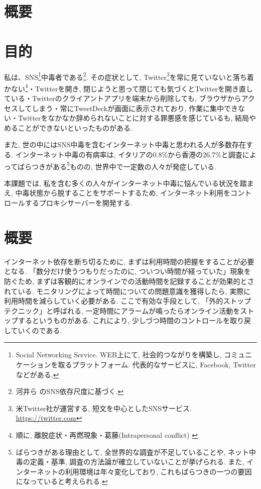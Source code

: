 \documentclass[10pt,a4paper,uplatex,a4j,dvipdfmx]{jsarticle}
\begin{document}
    \section*{概要}


    \newpage

    \begin{multicols}{2}

    \section{目的}
    私は、SNS\footnote{Social Networking Service. WEB上にて, 社会的つながりを構築し, コミュニケーションを取るプラットフォーム. 代表的なサービスに, Facebook, Twitterなどがある.}中毒者である\footnote{河井ら \cite{kawai2011sns} のSNS依存尺度に基づく.}.
    その症状として, Twitter\footnote{米Twitter社が運営する, 短文を中心としたSNSサービス. \url{https://twitter.com}}を常に見ていないと落ち着かない\footnote{順に, 離脱症状・再燃現象・葛藤(Intrapersonal conflict) \cite{griffiths2005} \label{tw}}・Twitterを開き, 閉じようと思って閉じても気づくとTwitterを開き直している・Twitterのクライアントアプリを端末から削除しても, ブラウザからアクセスしてしまう・常にTweetDeckが画面に表示されており, 作業に集中できない・Twitterをなかなか辞められないことに対する罪悪感を感じているも, 結局やめることができないといったものがある.
    
    また, 世の中にはSNS中毒を含むインターネット中毒と思われる人が多数存在する.
    インターネット中毒の有病率は, イタリアの0.8\%から香港の26.7\%と調査によってばらつきがある\footnote{ばらつきがある理由として, 全世界的な調査が不足していることや, ネット中毒の定義・基準, 調査の方法論が確立していないことが挙げられる\cite{IAreview}. また, インターネットの利用環境は年々変化しており, これもばらつきの一つの要因になっていると考えられる.}ものの, 世界中で一定数の人々が発症している\cite{IAreview}.
    
  本課題では, 私を含む多くの人々がインターネット中毒に悩んでいる状況を踏まえ, 中毒状態から脱することをサポートするため, インターネット利用をコントロールするプロキシサーバーを開発する.



    \section{概要}
    インターネット依存を断ち切るために, まずは利用時間の把握をすることが必要となる. 「数分だけ使うつもりだったのに, ついつい時間が経っていた」現象を防ぐため, まずは客観的にオンラインでの活動時間を記録することが効果的とされている\cite{internetaddiction}.
    モニタリングによって時間についての問題意識を獲得したら, 実際に利用時間を減らしていく必要がある. ここで有効な手段として, 「外的ストップテクニック」と呼ばれる, 一定時間にアラームが鳴ったらオンライン活動をストップするというものがある\cite{internetaddiction}. これにより, 少しづつ時間のコントロールを取り戻していくのである.


\end{multicols}
\end{document}
